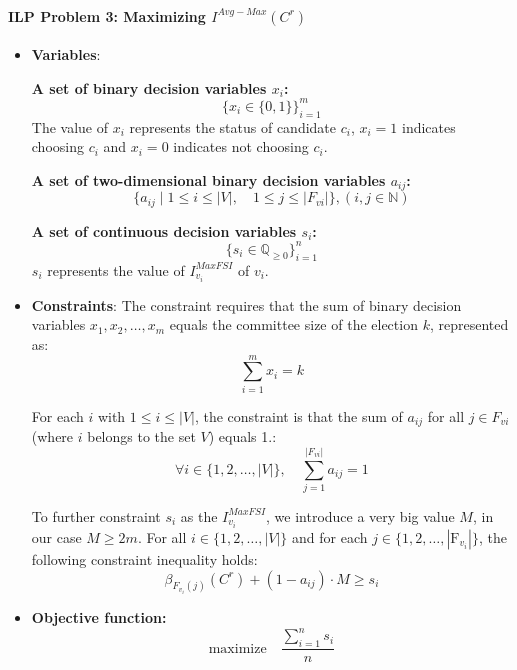\documentclass{article}
\begin{document}
\paragraph*{ILP Problem 3: Maximizing  $I^{Avg-Max}(C^{r})$}

\begin{itemize}

  \item \textbf{Variables}: 

\textbf{A set of binary decision variables $x_i$:} \[ \bigg\{ x_i \in \{0, 1\} \bigg\}_{i=1}^m \] The value of $x_i$ represents the status of candidate $c_i$, \(x_i = 1\) indicates choosing $c_i$ and \(x_i = 0\) indicates not choosing $c_i$.


\textbf{A set of two-dimensional binary decision variables \( a_{ij} \):}
\[
\{ a_{ij} \mid 1 \leq i \leq |V|, \quad 1 \leq j \leq |F_{vi}| \},  (i, j \in \mathbb{N})
\]

\textbf{A set of continuous decision variables $s_i$:} 
\[ \bigg\{ s_i \in \mathbb{Q}_{\geq 0} \bigg\}_{i=1}^n \] 
$s_i$ represents the value of $I_{v_i}^{MaxFSI}$ of \(v_i\).
    \item \textbf{Constraints}:
The constraint requires that the sum of binary decision variables \(x_1, x_2, \ldots, x_m\) equals the committee size of the election \(k\), represented as:
\begin{equation} \sum_{i=1}^m x_i = k \label{eq:ilpavgmax1}
\end{equation}

For each \(i\) with \(1 \leq i \leq |V|\), the constraint is that the sum of \( a_{ij} \) for all \( j \in F_{vi} \) (where \( i \) belongs to the set \( V \)) equals 1.:
\begin{equation} \forall i \in \{1, 2, \ldots, |V|\}, \quad \sum_{j=1}^{|F_{vi}|} a_{ij} = 1 \label{eq:ilpavgmax2}
\end{equation}

To further constraint $s_i$ as the $I_{v_i}^{MaxFSI}$, we introduce a very big value $M$, in our case $M \geq  2m$. For all \( i \in \{1, 2, \ldots, |V|\} \) and for each  \( j \in \{1, 2, \ldots, |\text{F}_{v_i}|\} \), the following constraint inequality holds:
\begin{equation} \beta_{F_{v_i}(j)}(C^{r}) + (1 - a_{ij})\cdot M \geq s_i \label{eq:ilpavgmax3}
\end{equation}
  
  \item  \textbf{Objective function:}
  \begin{equation}\text{maximize} \quad \frac{\sum_{i=1}^{n} s_i}{n}    \label{eq:ilpavgmax4}
\end{equation}



\end{itemize}
\end{document}

